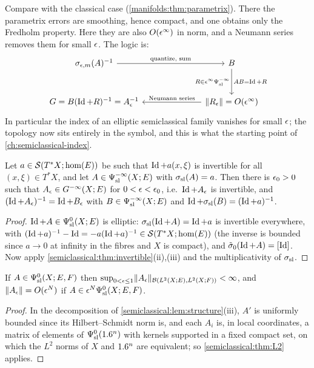 Compare with the classical case (\cref{manifolds:thm:parametrix}). There the
parametrix errors are smoothing, hence compact, and one obtains only the
Fredholm property. Here they are also $O(\epsilon^\infty)$ in norm, and a Neumann
series removes them for small $\epsilon$. The logic is:
\begin{equation*}
\begin{tikzcd}[column sep=7em,row sep=large]
\sigma_{\eps,m}(A)^{-1}\arrow[r,"\text{quantize, sum}"]
&B\arrow[d,"AB=\Id+R",
  "R\in\eps^\infty\Psisl{-\infty}"']\\
G=B(\Id+R)^{-1}=A_\eps^{-1}
&\norm{R_\eps}=O(\eps^\infty)\arrow[l,"\text{Neumann series}"']
\end{tikzcd}
\end{equation*}
In particular the index of an elliptic semiclassical family vanishes for
small $\epsilon$; the topology now sits entirely in the symbol, and this is what
the starting point of \cref{ch:semiclassical-index}.

\begin{corollary}\label{semiclassical:cor:G}
  Let $a\in\mathcal{S}(T^*X;\hom(E))$ be such that $\operatorname{Id}+a(x,\xi)$ is invertible for all
  $(x,\xi)\in T^*X$, and let $A\in\Psi^{-\infty}_{\mathrm{sl}}(X;E)$ with $\sigma_{\mathrm{sl}}(A)=a$. Then there
  is $\epsilon_0>0$ such that $A_\epsilon\in G^{-\infty}(X;E)$ for $0<\epsilon<\epsilon_0$, i.e.\ $\operatorname{Id}+A_\epsilon$ is
  invertible, and $(\operatorname{Id}+A_\epsilon)^{-1}=\operatorname{Id}+B_\epsilon$ with $B\in\Psi^{-\infty}_{\mathrm{sl}}(X;E)$ and
  $\operatorname{Id}+\sigma_{\mathrm{sl}}(B)=(\operatorname{Id}+a)^{-1}$.
\end{corollary}
\begin{proof}
  $\operatorname{Id}+A\in\Psi^{0}_{\mathrm{sl}}(X;E)$ is elliptic: $\sigma_{\mathrm{sl}}(\operatorname{Id}+A)=\operatorname{Id}+a$ is invertible
  everywhere, with $(\operatorname{Id}+a)^{-1}-\operatorname{Id}=-a(\operatorname{Id}+a)^{-1}\in\mathcal{S}(T^*X;\hom(E))$ (the
  inverse is bounded since $a\to0$ at infinity in the fibres and $X$ is compact),
  and $\tilde\sigma_0(\operatorname{Id}+A)=[\operatorname{Id}]$. Now apply \cref{semiclassical:thm:invertible}(ii),(iii)
  and the multiplicativity of $\sigma_{\mathrm{sl}}$.
\end{proof}

\begin{theorem}\label{semiclassical:thm:L2-X}
  If $A\in\Psi^{0}_{\mathrm{sl}}(X;E,F)$ then $\sup_{0<\epsilon\le1}\lVert A_\epsilon\rVert_{\mathcal{B}(L^2(X;E),L^2(X;F))}<\infty$,
  and $\lVert A_\epsilon\rVert=O(\epsilon^N)$ if $A\in\epsilon^N\Psi^{0}_{\mathrm{sl}}(X;E,F)$.
\end{theorem}
\begin{proof}
  In the decomposition of \cref{semiclassical:lem:structure}(iii), $A'$ is
  uniformly bounded since its Hilbert--Schmidt norm is, and each $A_i$ is, in
  local coordinates, a matrix of elements of $\Psi^{0}_{\mathrm{sl}}(1.6^n)$ with kernels supported in
  a fixed compact set, on which the $L^2$ norms of $X$ and $1.6^n$ are equivalent;
  so \cref{semiclassical:thm:L2} applies.
\end{proof}

